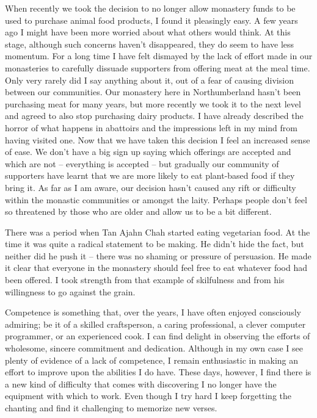When recently we took the decision to no longer allow monastery funds to be
used to purchase animal food products, I found it pleasingly easy. A few
years ago I might have been more worried about what others would think.
At this stage, although such concerns haven't disappeared, they do seem
to have less momentum. For a long time I have felt dismayed by the lack
of effort made in our monasteries to carefully dissuade supporters from
offering meat at the meal time. Only very rarely did I say anything
about it, out of a fear of causing division between our communities. Our
monastery here in Northumberland hasn't been purchasing meat for many
years, but more recently we took it to the next level and agreed to also
stop purchasing dairy products. I have already described the horror of
what happens in abattoirs and the impressions left in my mind from
having visited one. Now that we have taken this decision I feel an
increased sense of ease. We don't have a big sign up saying which
offerings are accepted and which are not -- everything is accepted --
but gradually our community of supporters have learnt that we are more
likely to eat plant-based food if they bring it. As far as I am aware,
our decision hasn't caused any rift or difficulty within the monastic
communities or amongst the laity. Perhaps people don't feel so
threatened by those who are older and allow us to be a bit different.

There was a period when Tan Ajahn Chah started eating vegetarian food.
At the time it was quite a radical statement to be making. He didn't
hide the fact, but neither did he push it -- there was no shaming or
pressure of persuasion. He made it clear that everyone in the monastery
should feel free to eat whatever food had been offered. I took strength
from that example of skilfulness and from his willingness to go against
the grain.

Competence is something that, over the years, I have often enjoyed consciously admiring; be it of a skilled craftsperson, a caring
professional, a clever computer programmer, or an experienced cook. I can find delight in observing the efforts of wholesome, sincere commitment and dedication. Although in my own case I see plenty of evidence of a
lack of competence, I remain enthusiastic in making an effort to improve
upon the abilities I do have. These days, however, I find there is a new
kind of difficulty that comes with discovering I no longer have the
equipment with which to work. Even though I try hard I keep forgetting the chanting and find it challenging to memorize new verses.

